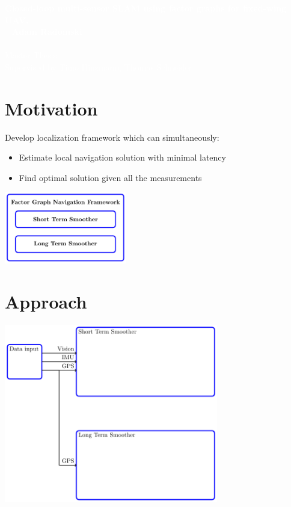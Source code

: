\documentclass[%
    fourtothree=true, %
    DepLogo=true     %
    ]{ETHpres}
\newcommand*{\ETHtitle}{Closed-loop multi-sensor SLAM using factor graphs for fixed-wing UAV.}
\newcommand*{\ETHauthor}{Adam Radomski}
\begin{document}
\ETHtitelbild\textcolor{white}{\large\textbf{\ETHtitle}}\\~\newline\hspace{6mm}\normalsize%
\textcolor{white}{
\textbf{\ETHauthor}\\ \\
Master Thesis\\
Supervised by Timo Hinzmann, Thomas Schneider}\\


\ETHslide
\section*{Motivation}
Develop localization framework which can simultaneously:
\begin{itemize}
	\item[\ETHitem] Estimate local navigation solution with minimal latency
	\item[\ETHitem] Find optimal solution given all the measurements
\end{itemize}

\begin{center}
\includegraphics[width=0.4\textwidth]{TikZ_drawings/Simple_STS_and_LTS_diagram/Simple_STS_and_LTS.pdf}\\
\end{center}

\clearpage

\ETHslide
\section*{Approach}
\begin{center}
\includegraphics[width=0.7\textwidth]{TikZ_drawings/STS_and_LTS/STSandLTS.pdf}\\
\end{center}
\end{document}
